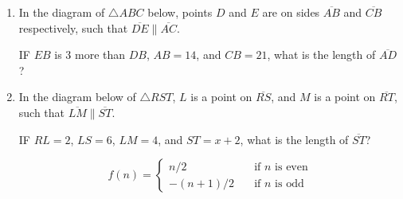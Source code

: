 \documentclass[12pt, oneside]{article}
\begin{document}
\begin{enumerate}[itemsep=2cm]
\item In the diagram of $\triangle ABC$ below, points $D$ and $E$ are on sides $\overline{AB}$ and $\overline{CB}$ respectively, such that $\overline{DE} \parallel \overline{AC}$.
\begin{center}
\end{center}
IF $EB$ is 3 more than $DB$, $AB=14$, and $CB=21$, what is the length of $\overline{AD}$?

\newpage
\item In the diagram below of $\triangle RST$, $L$ is a point on $\overline{RS}$, and $M$ is a point on $\overline{RT}$, such that $\overline{LM} \parallel \overline{ST}$.
\begin{center}
\end{center}
IF $RL=2$, $LS=6$, $LM=4$, and $ST=x+2$, what is the length of $\overline{ST}$?

\newpage
\[ f(n) =
  \begin{cases}
    n/2       & \quad \text{if } n \text{ is even}\\
    -(n+1)/2  & \quad \text{if } n \text{ is odd}
  \end{cases}
\]

\end{enumerate}
\end{document}
